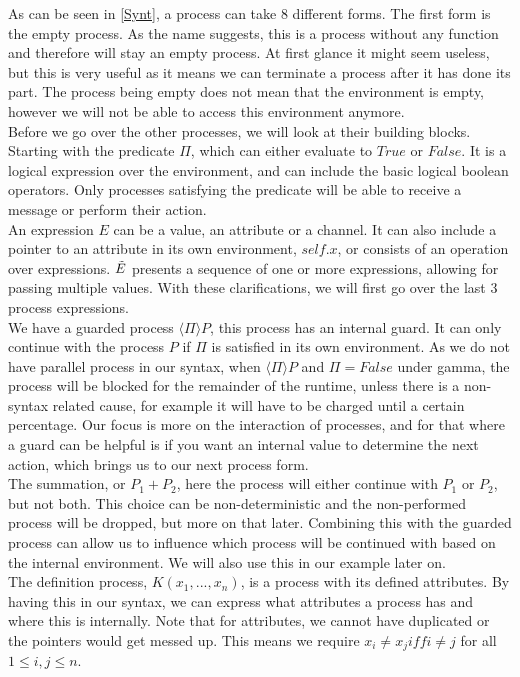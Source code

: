 As can be seen in \ref{Synt}, a process can take 8 different forms. The first form is the empty process. As the name suggests, this is a process without any function and therefore will stay an empty process. At first glance it might seem useless, but this is very useful as it means we can terminate a process after it has done its part. The process being empty does not mean that the environment is empty, however we will not be able to access this environment anymore.\\
Before we go over the other processes, we will look at their building blocks. Starting with the predicate $\Pi$, which can either evaluate to $True$ or $False$. It is a logical expression over the environment, and can include the basic logical boolean operators. Only processes satisfying the predicate will be able to receive a message or perform their action.\\
An expression $E$ can be a value, an attribute or a channel. It can also include a pointer to an attribute in its own environment, $self.x$, or consists of an operation over expressions. $\Tilde{E}$ presents a sequence of one or more expressions, allowing for passing multiple values. With these clarifications, we will first go over the last 3 process expressions. \\
We have a guarded process $\langle \Pi \rangle P$, this process has an internal guard. It can only continue with the process $P$ if $\Pi$ is satisfied in its own environment. As we do not have parallel process in our syntax, when $\langle \Pi \rangle P$ and $\Pi = False$ under gamma, the process will be blocked for the remainder of the runtime, unless there is a non-syntax related cause, for example it will have to be charged until a certain percentage. Our focus is more on the interaction of processes, and for that where a guard can be helpful is if you want an internal value to determine the next action, which brings us to our next process form.\\
The summation, or $P_1+P_2$, here the process will either continue with $P_1$ or $P_2$, but not both. This choice can be non-deterministic and the non-performed process will be dropped, but more on that later. Combining this with the guarded process can allow us to influence which process will be continued with based on the internal environment. We will also use this in our example later on.\\
The definition process, $K(x_1,...,x_n)$, is a process with its defined attributes. By having this in our syntax, we can express what attributes a process has and where this is internally. Note that for attributes, we cannot have duplicated or the pointers would get messed up. This means we require $x_i\not = x_j iff i\not = j$ for all $1\leq i,j \leq n$.\\
